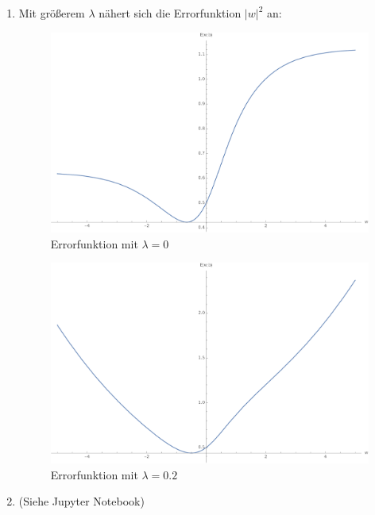 \documentclass{article}
\begin{document}
\begin{enumerate}
        \item Mit größerem $\lambda$ nähert sich die Errorfunktion $|w|^2$ an:
                \begin{figure}[H]
                  \centering
                  \includegraphics[width=\textwidth]{Errorfunction1.pdf}
                  \caption{Errorfunktion mit $\lambda=0$}
                \end{figure}
                \begin{figure}[H]
                  \centering
                  \includegraphics[width=\textwidth]{Errorfunction2.pdf}
                  \caption{Errorfunktion mit $\lambda=0.2$}
                \end{figure}
        \item (Siehe Jupyter Notebook)
\end{enumerate}
\end{document}
